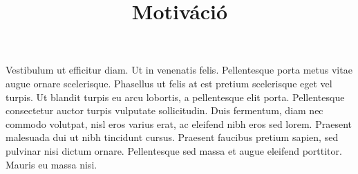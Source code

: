 \documentclass[../Main.tex]{subfiles}
\begin{document}
\title{Motiváció}

Vestibulum ut efficitur diam. Ut in venenatis felis.
Pellentesque porta metus vitae augue ornare scelerisque.
Phasellus ut felis at est pretium scelerisque eget vel turpis.
Ut blandit turpis eu arcu lobortis, a pellentesque elit porta.
Pellentesque consectetur auctor turpis vulputate sollicitudin.
Duis fermentum, diam nec commodo volutpat, nisl eros varius erat,
ac eleifend nibh eros sed lorem. Praesent malesuada dui ut nibh 
tincidunt cursus. Praesent faucibus pretium sapien, sed pulvinar nisi
dictum ornare. Pellentesque sed massa et augue eleifend porttitor.
Mauris eu massa nisi.
\end{document}
